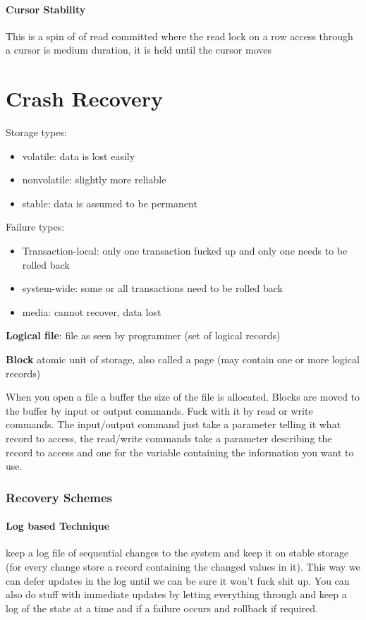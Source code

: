 \documentclass{article}
\begin{document}
\paragraph{Cursor Stability} %
\label{par:cursor_stability}
This is a spin of of read committed where the read lock on a row access through a cursor is medium duration, it is held until the cursor moves

\section*{Crash Recovery} %
\label{sec:crash_recovery}
Storage types:
\begin{itemize}
    \item volatile: data is lost easily
    \item nonvolatile: slightly more reliable
    \item stable: data is assumed to be permanent
\end{itemize}

Failure types:
\begin{itemize}
    \item Transaction-local: only one transaction fucked up and only one needs to be rolled back
    \item system-wide: some or all transactions need to be rolled back
    \item media: cannot recover, data lost
\end{itemize}

\textbf{Logical file}: file as seen by programmer (set of logical records)

\textbf{Block} atomic unit of storage, also called a page (may contain one or more logical records)

When you open a file a buffer the size of the file is allocated. Blocks are moved to the buffer by input or output commands. Fuck with it by read or write commands. The input/output command just take a parameter telling it what record to access, the read/write commands take a parameter describing the record to access and one for the variable containing the information you want to use.

\subsubsection{Recovery Schemes} %
\label{ssub:recovery_schemes}
\paragraph{Log based Technique} %
\label{par:log_based_technique}
keep a log file of sequential changes to the system and keep it on stable storage (for every change store a record containing the changed values in it). This way we can defer updates in the log until we can be sure it won't fuck shit up. You can also do stuff with immediate updates by letting everything through and keep a log of the state at a time and if a failure occurs and rollback if required.
\end{document}
